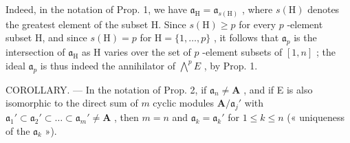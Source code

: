 Indeed, in the notation of Prop. 1, we have \(\mathfrak{a}_{\mathrm{H}} = \mathfrak{a}_{s(\mathrm{H})}\) , where \(s(\mathrm{H})\) denotes the greatest element of the subset H. Since \(s(\mathrm{H}) \geqslant p\) for every \(p\) -element subset H, and since \(s(\mathrm{H}) = p\) for \(\mathrm{H} = \{1, \dots, p\}\) , it follows that \(\mathfrak{a}_p\) is the intersection of \(\mathfrak{a}_{\mathrm{H}}\) as H varies over the set of \(p\) -element subsets of \([1, n]\) ; the ideal \(\mathfrak{a}_p\) is thus indeed the annihilator of \(\bigwedge^p E\) , by Prop. 1.

COROLLARY. --- In the notation of Prop. 2, if \(\mathfrak{a}_n \neq \mathbf{A}\) , and if E is also isomorphic to the direct sum of \(m\) cyclic modules \(\mathbf{A} / \mathfrak{a}_j'\) with \(\mathfrak{a}_1' \subset \mathfrak{a}_2' \subset \ldots \subset \mathfrak{a}_m' \neq \mathbf{A}\) , then \(m = n\) and \(\mathfrak{a}_k = \mathfrak{a}_k'\) for \(1 \leqslant k \leqslant n\) (« uniqueness of the \(\mathfrak{a}_k\) »).
\relax{}
